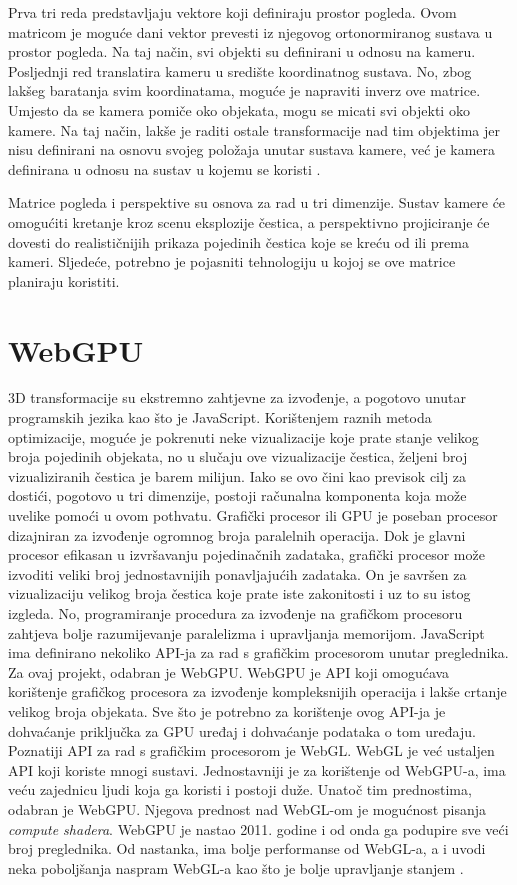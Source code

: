 \documentclass{foi}
\begin{document}
Prva tri reda predstavljaju vektore koji definiraju prostor pogleda. Ovom matricom je moguće dani vektor prevesti iz njegovog ortonormiranog sustava u prostor pogleda. Na taj način, svi objekti su definirani u odnosu na kameru. Posljednji red translatira kameru u središte koordinatnog sustava. No, zbog lakšeg baratanja svim koordinatama, moguće je napraviti inverz ove matrice. Umjesto da se kamera pomiče oko objekata, mogu se micati svi objekti oko kamere. Na taj način, lakše je raditi ostale transformacije nad tim objektima jer nisu definirani na osnovu svojeg položaja unutar sustava kamere, već je kamera definirana u odnosu na sustav u kojemu se koristi \parencite{KameraBezDat}.

Matrice pogleda i perspektive su osnova za rad u tri dimenzije. Sustav kamere će omogućiti kretanje kroz scenu eksplozije čestica, a perspektivno projiciranje će dovesti do realističnijih prikaza pojedinih čestica koje se kreću od ili prema kameri. Sljedeće, potrebno je pojasniti tehnologiju u kojoj se ove matrice planiraju koristiti.

\section{WebGPU}
3D transformacije su ekstremno zahtjevne za izvođenje, a pogotovo unutar programskih jezika kao što je JavaScript. Korištenjem raznih metoda optimizacije, moguće je pokrenuti neke vizualizacije koje prate stanje velikog broja pojedinih objekata, no u slučaju ove vizualizacije čestica, željeni broj vizualiziranih čestica je barem milijun. Iako se ovo čini kao previsok cilj za dostići, pogotovo u tri dimenzije, postoji računalna komponenta koja može uvelike pomoći u ovom pothvatu. Grafički procesor ili GPU je poseban procesor dizajniran za izvođenje ogromnog broja paralelnih operacija. Dok je glavni procesor efikasan u izvršavanju pojedinačnih zadataka, grafički procesor može izvoditi veliki broj jednostavnijih ponavljajućih zadataka. On je savršen za vizualizaciju velikog broja čestica koje prate iste zakonitosti i uz to su istog izgleda. No, programiranje procedura za izvođenje na grafičkom procesoru zahtjeva bolje razumijevanje paralelizma i upravljanja memorijom. JavaScript ima definirano nekoliko API-ja za rad s grafičkim procesorom unutar preglednika. Za ovaj projekt, odabran je WebGPU.  WebGPU je API koji omogućava korištenje grafičkog procesora za izvođenje kompleksnijih operacija i lakše crtanje velikog broja objekata. Sve što je potrebno za korištenje ovog API-ja je dohvaćanje priključka za GPU uređaj i dohvaćanje podataka o tom uređaju. Poznatiji API za rad s grafičkim procesorom je WebGL. WebGL je već ustaljen API koji koriste mnogi sustavi. Jednostavniji je za korištenje od WebGPU-a, ima veću zajednicu ljudi koja ga koristi i postoji duže. Unatoč tim prednostima, odabran je WebGPU. Njegova prednost nad WebGL-om je mogućnost pisanja \textit{compute shadera}. WebGPU je nastao 2011. godine i od onda ga podupire sve veći broj preglednika. Od nastanka, ima bolje performanse od WebGL-a, a i uvodi neka poboljšanja naspram WebGL-a kao što je bolje upravljanje stanjem \parencite{DocWebGPU}. 
\end{document}
